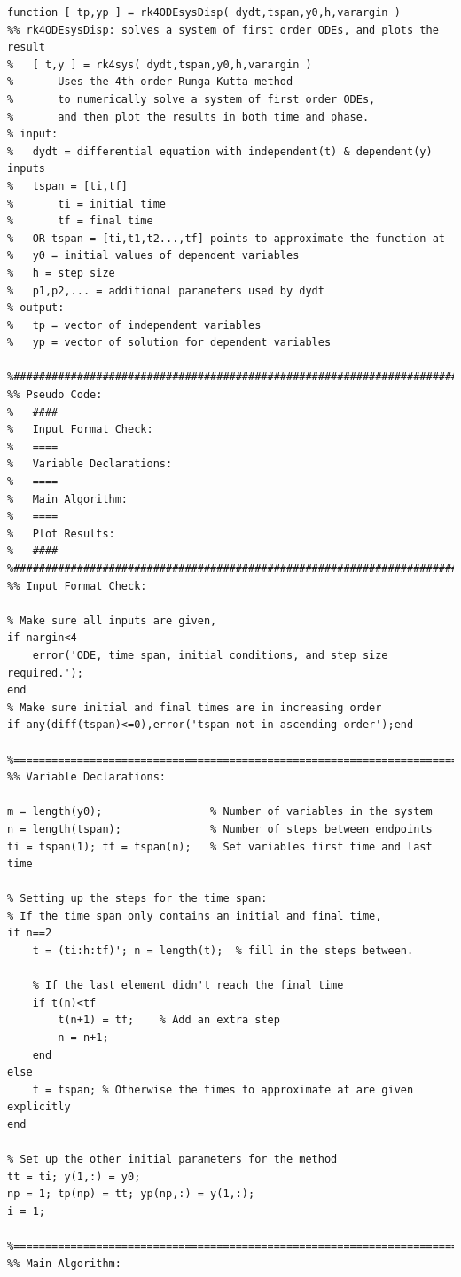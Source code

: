 \documentclass{article}
\begin{document}
\begin{lstlisting}
function [ tp,yp ] = rk4ODEsysDisp( dydt,tspan,y0,h,varargin )
%% rk4ODEsysDisp: solves a system of first order ODEs, and plots the result
%   [ t,y ] = rk4sys( dydt,tspan,y0,h,varargin )
%       Uses the 4th order Runga Kutta method
%       to numerically solve a system of first order ODEs,
%       and then plot the results in both time and phase.
% input:
%   dydt = differential equation with independent(t) & dependent(y) inputs
%   tspan = [ti,tf]
%       ti = initial time
%       tf = final time
%   OR tspan = [ti,t1,t2...,tf] points to approximate the function at
%   y0 = initial values of dependent variables
%   h = step size
%   p1,p2,... = additional parameters used by dydt
% output:
%   tp = vector of independent variables
%   yp = vector of solution for dependent variables

%##########################################################################
%% Pseudo Code:
%   ####
%   Input Format Check:
%   ====
%   Variable Declarations:
%   ====
%   Main Algorithm:
%   ====
%   Plot Results:
%   ####
%##########################################################################
%% Input Format Check:

% Make sure all inputs are given,
if nargin<4
    error('ODE, time span, initial conditions, and step size required.');
end
% Make sure initial and final times are in increasing order
if any(diff(tspan)<=0),error('tspan not in ascending order');end

%==========================================================================
%% Variable Declarations:

m = length(y0);                 % Number of variables in the system
n = length(tspan);              % Number of steps between endpoints
ti = tspan(1); tf = tspan(n);   % Set variables first time and last time

% Setting up the steps for the time span:
% If the time span only contains an initial and final time,
if n==2
    t = (ti:h:tf)'; n = length(t);  % fill in the steps between.
    
    % If the last element didn't reach the final time
    if t(n)<tf
        t(n+1) = tf;    % Add an extra step
        n = n+1;
    end
else
    t = tspan; % Otherwise the times to approximate at are given explicitly
end

% Set up the other initial parameters for the method
tt = ti; y(1,:) = y0;
np = 1; tp(np) = tt; yp(np,:) = y(1,:);
i = 1;

%==========================================================================
%% Main Algorithm:


\end{lstlisting}
\end{document}
